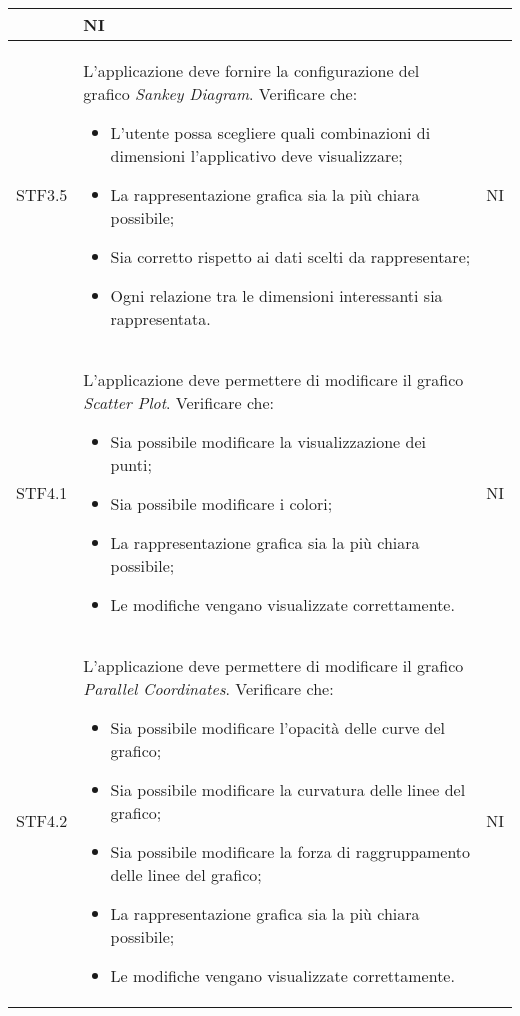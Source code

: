 \begin{center}
\begin{longtable}{|p{1.5cm}|p{11cm}|p{1cm}|}
\begin{itemize}
        \end{itemize} & NI\\ \hline
        \rowcolor[HTML]{EFEFEF}
        STF3.5 & L'applicazione deve fornire la configurazione del grafico \textit{Sankey Diagram}. Verificare che: \begin{itemize}
            \item L'utente possa scegliere quali combinazioni di dimensioni l'applicativo deve visualizzare;
            \item La rappresentazione grafica sia la più chiara possibile;
            \item Sia corretto rispetto ai dati scelti da rappresentare;
            \item Ogni relazione tra le dimensioni interessanti sia rappresentata.
        \end{itemize} & NI\\ \hline
        \rowcolor[HTML]{C0C0C0}
        STF4.1 & L'applicazione deve permettere di modificare il grafico \textit{Scatter Plot}. Verificare che: \begin{itemize}
            \item Sia possibile modificare la visualizzazione dei punti;
            \item Sia possibile modificare i colori;
            \item La rappresentazione grafica sia la più chiara possibile;
            \item Le modifiche vengano visualizzate correttamente.
        \end{itemize} & NI\\ \hline
        \rowcolor[HTML]{EFEFEF}
        STF4.2 & L'applicazione deve permettere di modificare il grafico \textit{Parallel Coordinates}. Verificare che: \begin{itemize}
            \item Sia possibile modificare l'opacità delle curve del grafico;
            \item Sia possibile modificare la curvatura delle linee del grafico;
            \item Sia possibile modificare la forza di raggruppamento delle linee del grafico;
            \item La rappresentazione grafica sia la più chiara possibile;
            \item Le modifiche vengano visualizzate correttamente.
        \end{itemize} & NI\\ \hline

\end{longtable}
\end{center}
